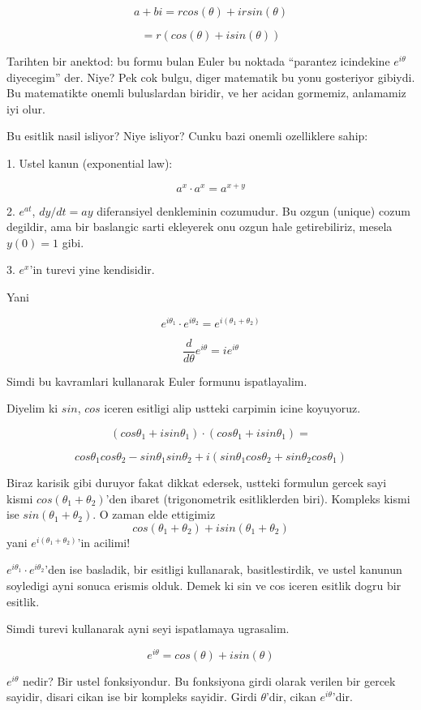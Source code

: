 \documentclass[12pt,fleqn]{article}
\begin{document}
\[ a+bi = rcos(\theta) + irsin(\theta) \]

\[ = r (cos(\theta) + isin(\theta)) \]

Tarihten bir anektod: bu formu bulan Euler bu noktada ``parantez icindekine
$e^{i\theta}$ diyecegim'' der. Niye? Pek cok bulgu, diger matematik bu yonu
gosteriyor gibiydi. Bu matematikte onemli buluslardan biridir, ve her
acidan gormemiz, anlamamiz iyi olur. 

Bu esitlik nasil isliyor? Niye isliyor? Cunku bazi onemli ozelliklere sahip:

1. Ustel kanun (exponential law):

\[ a^x \cdot a^x = a^{x+y} \]

2. $e^{at}$, $dy/dt = ay$ diferansiyel denkleminin cozumudur. Bu ozgun
(unique) cozum degildir, ama bir baslangic sarti ekleyerek onu ozgun hale
getirebiliriz, mesela $y(0)=1$ gibi.

3. $e^x$'in turevi yine kendisidir. 

Yani

\[ e^{i\theta_1} \cdot  e^{i\theta_2} = e^{i(\theta_1 + \theta_2)}\]

\[ \frac{d}{d\theta} e^{i\theta} = i e^{i\theta} \]

Simdi bu kavramlari kullanarak Euler formunu ispatlayalim. 

Diyelim ki $sin$, $cos$ iceren esitligi alip ustteki carpimin icine
koyuyoruz.

\[ 
(cos\theta_1 + isin\theta_1) \cdot (cos\theta_1 + isin\theta_1) =
\] 

\[  
cos\theta_1cos\theta_2 - sin\theta_1sin\theta_2 +
i(sin\theta_1cos\theta_2 + sin\theta_2cos\theta_1 )
\] 

Biraz karisik gibi duruyor fakat dikkat edersek, ustteki formulun gercek
sayi kismi $cos(\theta_1 + \theta_2)$'den ibaret (trigonometrik esitliklerden biri). 
Kompleks kismi ise $sin(\theta_1 + \theta_2)$. O zaman elde ettigimiz \[
cos(\theta_1+\theta_2) + isin(\theta_1+\theta_2) \] 
yani $e^{i(\theta_1+\theta_2)}$'in acilimi!

$e^{i\theta_1} \cdot e^{i\theta_2}$'den ise basladik, bir esitligi kullanarak, basitlestirdik, 
ve ustel kanunun soyledigi ayni sonuca erismis olduk. Demek ki sin ve cos 
iceren esitlik dogru bir esitlik.

Simdi turevi kullanarak ayni seyi ispatlamaya ugrasalim. 

\[ e^{i\theta} = cos(\theta) + isin(\theta) \]

$e^{i\theta}$ nedir? Bir ustel fonksiyondur. Bu fonksiyona girdi olarak
verilen bir gercek sayidir, disari cikan ise bir kompleks sayidir. Girdi
$\theta$'dir, cikan $e^{i\theta}$'dir.
\end{document}
